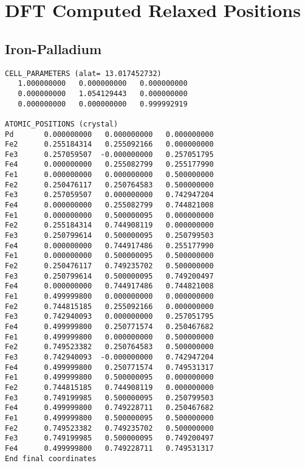 \chapter{DFT Computed Relaxed Positions}
\label{section:dftrelaxedpositions}



\section{Iron-Palladium}

\begin{lstlisting}[style=terminal,caption={Relaxed Fe Pd Configuration}]
CELL_PARAMETERS (alat= 13.017452732)
   1.000000000   0.000000000   0.000000000
   0.000000000   1.054129443   0.000000000
   0.000000000   0.000000000   0.999992919

ATOMIC_POSITIONS (crystal)
Pd       0.000000000   0.000000000   0.000000000
Fe2      0.255184314   0.255092166   0.000000000
Fe3      0.257059507  -0.000000000   0.257051795
Fe4      0.000000000   0.255082799   0.255177990
Fe1      0.000000000   0.000000000   0.500000000
Fe2      0.250476117   0.250764583   0.500000000
Fe3      0.257059507   0.000000000   0.742947204
Fe4      0.000000000   0.255082799   0.744821008
Fe1      0.000000000   0.500000095   0.000000000
Fe2      0.255184314   0.744908119   0.000000000
Fe3      0.250799614   0.500000095   0.250799503
Fe4      0.000000000   0.744917486   0.255177990
Fe1      0.000000000   0.500000095   0.500000000
Fe2      0.250476117   0.749235702   0.500000000
Fe3      0.250799614   0.500000095   0.749200497
Fe4      0.000000000   0.744917486   0.744821008
Fe1      0.499999800   0.000000000   0.000000000
Fe2      0.744815185   0.255092166   0.000000000
Fe3      0.742940093   0.000000000   0.257051795
Fe4      0.499999800   0.250771574   0.250467682
Fe1      0.499999800   0.000000000   0.500000000
Fe2      0.749523382   0.250764583   0.500000000
Fe3      0.742940093  -0.000000000   0.742947204
Fe4      0.499999800   0.250771574   0.749531317
Fe1      0.499999800   0.500000095   0.000000000
Fe2      0.744815185   0.744908119   0.000000000
Fe3      0.749199985   0.500000095   0.250799503
Fe4      0.499999800   0.749228711   0.250467682
Fe1      0.499999800   0.500000095   0.500000000
Fe2      0.749523382   0.749235702   0.500000000
Fe3      0.749199985   0.500000095   0.749200497
Fe4      0.499999800   0.749228711   0.749531317
End final coordinates
\end{lstlisting}